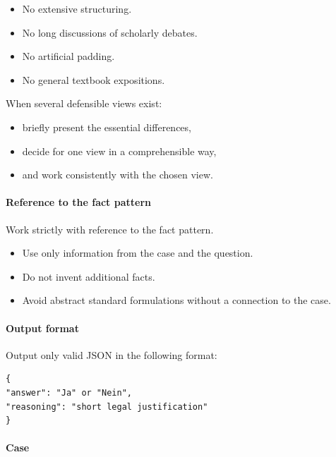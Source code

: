 \documentclass[11pt]{article}
\providecommand{\tightlist}{%
  \setlength{\itemsep}{0pt}\setlength{\parskip}{0pt}}
\begin{document}
\begin{itemize}
\tightlist
\item
  No extensive structuring.
\item
  No long discussions of scholarly debates.
\item
  No artificial padding.
\item
  No general textbook expositions.
\end{itemize}

When several defensible views exist:

\begin{itemize}
\tightlist
\item
  briefly present the essential differences,
\item
  decide for one view in a comprehensible way,
\item
  and work consistently with the chosen view.
\end{itemize}

\paragraph{Reference to the fact
pattern}\label{reference-to-the-fact-pattern}

Work strictly with reference to the fact pattern.

\begin{itemize}
\tightlist
\item
  Use only information from the case and the question.
\item
  Do not invent additional facts.
\item
  Avoid abstract standard formulations without a connection to the case.
\end{itemize}

\paragraph{Output format}\label{output-format-1}

Output only valid JSON in the following format:

\begin{verbatim}
{
"answer": "Ja" or "Nein",
"reasoning": "short legal justification"
}
\end{verbatim}

\paragraph{Case}\label{case}
\end{document}
